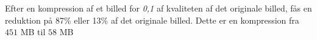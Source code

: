\documentclass[12pt]{article}
\begin{document}
Efter en kompression af et billed for \textit{0,1} af kvaliteten af det originale billed, fås en reduktion på 87\% eller 13\% af det originale billed. Dette er en kompression fra $451$ MB til $58$ MB 
\begin{figure}[ht]%
  \centering
\end{figure}
\newpage
\end{document}
